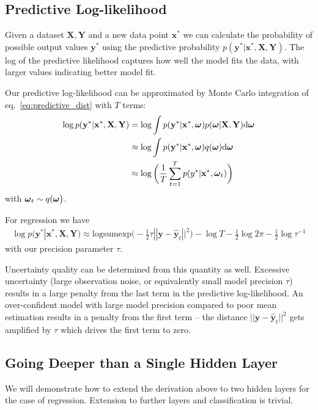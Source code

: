 \documentclass{article} %
\newcommand{\td}{\text{d}}
\newcommand{\x}{\mathbf{x}}
\newcommand{\y}{\mathbf{y}}
\newcommand{\X}{\mathbf{X}}
\newcommand{\Y}{\mathbf{Y}}
\newcommand{\bo}{\text{\boldmath$\omega$}}
\theoremstyle{definition}
\begin{document}
\subsection{Predictive Log-likelihood}

Given a dataset $\X, \Y$ and a new data point $\x^*$ we can calculate the probability of possible output values $\y^*$ using the predictive probability $p(\y^* | \x^*, \X, \Y)$. The log of the predictive likelihood captures how well the model fits the data, with larger values indicating better model fit. 

Our predictive log-likelihood can be approximated by Monte Carlo integration of eq.\ \eqref{eq:predictive_dist} with $T$ terms:
\begin{align*} 
\log p(\y^* | \x^*, \X, \Y) &= \log \int p ( \y^* | \x^*, \bo ) p (\bo | \X, \Y) \td \bo \\
&\approx \log \int p ( \y^* | \x^*, \bo ) q (\bo) \td \bo \\
&\approx \log \bigg( \frac{1}{T} \sum_{t=1}^T p ( y^* | \x^*, \bo_t ) \bigg)
\end{align*}
with $\bo_t \sim q ( \bo \big)$. 

For regression we have 
\newcommand{\logsumexp}{\text{logsumexp}}
\begin{align} \label{eq:predictive_dist_reg}
\log p(\y^* | \x^*, \X, \Y) \approx \logsumexp \bigg( -\frac{1}{2} \tau || \y - \widehat{\y}_t ||^2 \bigg) - \log T - \frac{1}{2} \log 2 \pi - \frac{1}{2} \log \tau^{-1}
\end{align}
with our precision parameter $\tau$.

Uncertainty quality can be determined from this quantity as well.
Excessive uncertainty (large observation noise, or equivalently small model precision $\tau$) results in a large penalty from the last term in the predictive log-likelihood. 
An over-confident model with large model precision compared to poor mean estimation results in a penalty from the first term -- the distance $|| \y - \widehat{\y}_t ||^2$ gets amplified by $\tau$ which drives the first term to zero.

\subsection{Going Deeper than a Single Hidden Layer} \label{sect:going_deep}

We will demonstrate how to extend the derivation above to two hidden layers for the case of regression. Extension to further layers and classification is trivial.
\end{document}
